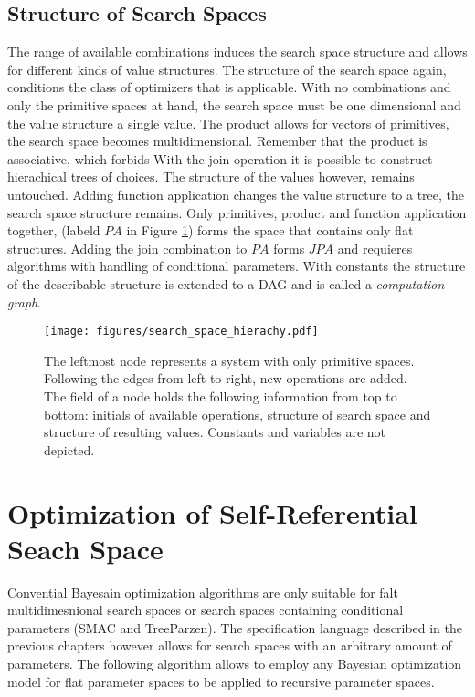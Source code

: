 \documentclass[english]{article}
\begin{document}
\subsection{Structure of Search Spaces}
The range of available combinations induces the search space structure and allows for different kinds of value structures. The structure of the search space again, conditions the class of optimizers that is applicable.
With no combinations and only the primitive spaces at hand, the search space must be one dimensional and the value structure a single value.
The product allows for vectors of primitives, the search space becomes multidimensional. Remember that the product is associative, which forbids
With the join operation it is possible to construct hierachical trees of choices. The structure of the values however, remains untouched.
Adding function application changes the value structure to a tree, the search space structure remains.
Only primitives, product and function application together, (labeld $PA$ in Figure \ref{space_structure}) forms the space that contains only flat structures. Adding the join combination to $PA$ forms $JPA$ and requieres algorithms with handling of conditional parameters.
With constants the structure of the describable structure is extended to a DAG and is called a \textit{computation graph}.


\begin{figure}
\texttt{[image: figures/search\_space\_hierachy.pdf]}

  \caption{The leftmost node represents a system with only primitive spaces. Following the edges from left to right, new operations are added. The field of a node holds the following information from top to bottom: initials of available operations, structure of search space and structure of resulting values. Constants and variables are not depicted.}
  \label{space_structure}
\end{figure}


\section{Optimization of Self-Referential Seach Space}
Convential Bayesain optimization algorithms are only suitable for falt multidimesnional search spaces or search spaces containing conditional parameters (SMAC and TreeParzen). The specification language described in the previous chapters however allows for search spaces with an arbitrary amount of parameters. The following algorithm allows to employ any Bayesian optimization model for flat parameter spaces to be applied to recursive parameter spaces.
\end{document}
